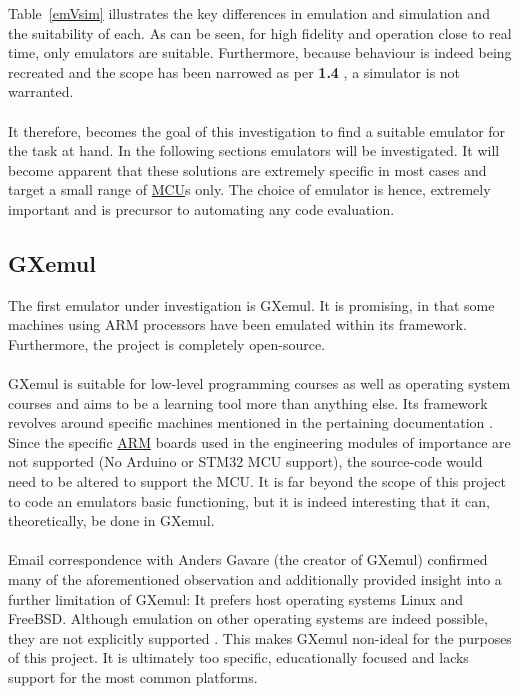 Table~\ref{emVsim} illustrates the key differences in emulation and simulation and the suitability of each. As can be seen, for high fidelity and operation close to real time, only emulators are suitable. Furthermore, because behaviour is indeed being recreated and the scope has been narrowed as per \textbf{1.4 }, a simulator is not warranted. 
\\\\
It therefore, becomes the goal of this investigation to find a suitable emulator for the task at hand. In the following sections emulators will be investigated. It will become apparent that these solutions are extremely specific in most cases and target a small range of \hyperref[listAbr]{MCU}s only. The choice of emulator is hence, extremely important and is precursor to automating any code evaluation.

\subsection{GXemul}
\label{GXemul}
The first emulator under investigation is GXemul. It is promising, in that some machines using ARM processors have been emulated within its framework. Furthermore, the project is completely open-source. \cite{Gavare}
\\\\
GXemul is suitable for low-level programming courses as well as operating system courses and aims to be a learning tool more than anything else. Its framework revolves around specific machines mentioned in the pertaining documentation \cite{Gavare}\cite{gavareEmail}. Since the specific \hyperref[listAbr]{ARM} boards used in the engineering modules of importance are not supported (No Arduino or STM32 MCU support), the source-code would need to be altered to support the MCU. It is far beyond the scope of this project to code an emulators basic functioning, but it is indeed interesting that it can, theoretically, be done in GXemul.
\\\\
Email correspondence with Anders Gavare (the creator of GXemul) confirmed many of the aforementioned observation and additionally provided insight into a further limitation of GXemul: It prefers host operating systems Linux and FreeBSD. Although emulation on other operating systems are indeed possible, they are not explicitly supported \cite{gavareEmail}. This makes GXemul non-ideal for the purposes of this project. It is ultimately too specific, educationally focused and lacks support for the most common platforms.
 
